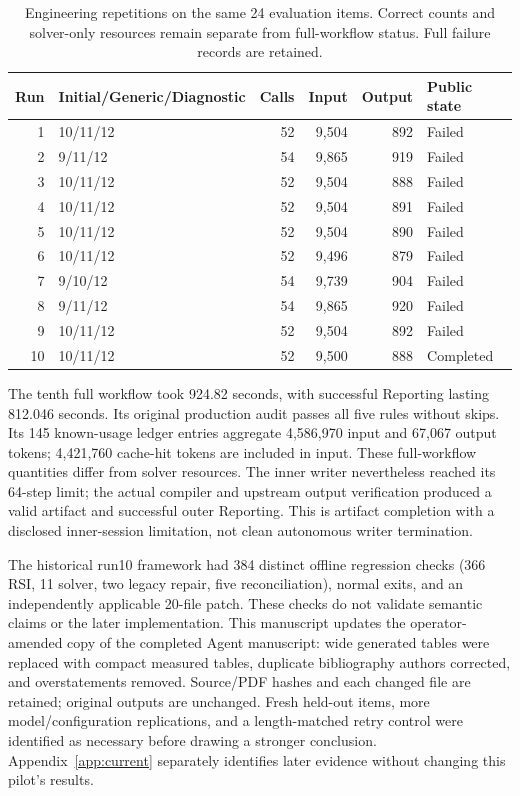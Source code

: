 \begin{table}[t]
\centering
\begin{tabular}{rlrrrl}
\toprule
Run & Initial/Generic/Diagnostic & Calls & Input & Output & Public state\\
\midrule
1 & 10/11/12 & 52 & 9,504 & 892 & Failed\\
2 & 9/11/12 & 54 & 9,865 & 919 & Failed\\
3 & 10/11/12 & 52 & 9,504 & 888 & Failed\\
4 & 10/11/12 & 52 & 9,504 & 891 & Failed\\
5 & 10/11/12 & 52 & 9,504 & 890 & Failed\\
6 & 10/11/12 & 52 & 9,496 & 879 & Failed\\
7 & 9/10/12 & 54 & 9,739 & 904 & Failed\\
8 & 9/11/12 & 54 & 9,865 & 920 & Failed\\
9 & 10/11/12 & 52 & 9,504 & 892 & Failed\\
10 & 10/11/12 & 52 & 9,500 & 888 & Completed\\
\bottomrule
\end{tabular}
\caption{Engineering repetitions on the same 24 evaluation items. Correct counts and solver-only resources remain separate from full-workflow status. Full failure records are retained.}
\label{tab:runs}
\end{table}

The tenth full workflow took 924.82 seconds, with successful Reporting lasting 812.046 seconds. Its original production audit passes all five rules without skips. Its 145 known-usage ledger entries aggregate 4,586,970 input and 67,067 output tokens; 4,421,760 cache-hit tokens are included in input. These full-workflow quantities differ from solver resources. The inner writer nevertheless reached its 64-step limit; the actual compiler and upstream output verification produced a valid artifact and successful outer Reporting. This is artifact completion with a disclosed inner-session limitation, not clean autonomous writer termination.

The historical run10 framework had 384 distinct offline regression checks (366 RSI, 11 solver, two legacy repair, five reconciliation), normal exits, and an independently applicable 20-file patch. These checks do not validate semantic claims or the later implementation. This manuscript updates the operator-amended copy of the completed Agent manuscript: wide generated tables were replaced with compact measured tables, duplicate bibliography authors corrected, and overstatements removed. Source/PDF hashes and each changed file are retained; original outputs are unchanged. Fresh held-out items, more model/configuration replications, and a length-matched retry control were identified as necessary before drawing a stronger conclusion. Appendix~\ref{app:current} separately identifies later evidence without changing this pilot's results.
